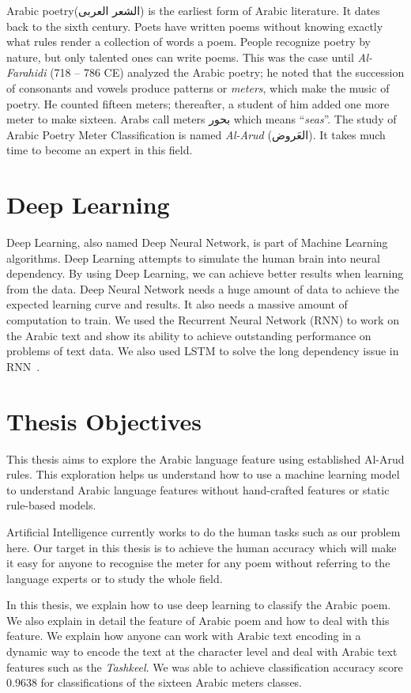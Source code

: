 Arabic poetry(\textarabic{الشعر العربى}) is the earliest form of Arabic literature. It dates back to the sixth century. Poets have written poems without knowing exactly what rules render a collection of words a poem. People recognize poetry by nature, but only talented ones can write poems. This was the case until \textit{Al-Farahidi} (718 – 786 CE) analyzed the Arabic poetry; he noted that the succession of consonants and vowels produce patterns or \textit{meters}, which make the music of poetry. He counted fifteen meters; thereafter, a student of him added one more meter to make sixteen. Arabs call meters \textarabic{بحور} which means ``\textit{seas}''. The study of Arabic Poetry Meter Classification is named \textit{Al-Arud} (\textarabic{العَروض}). It takes much time to become an expert in this field. 
\section{Deep Learning}

Deep Learning, also named Deep Neural Network, is part of Machine Learning algorithms. Deep Learning attempts to simulate the human brain into neural dependency.  By using Deep Learning, we can achieve better results when learning from the data. Deep Neural Network needs a huge amount of data to achieve the expected learning curve and results. It also needs a massive amount of computation to train. We used the Recurrent Neural Network (RNN) to work on the Arabic text and show its ability to achieve outstanding performance on problems of text data. We also used LSTM to solve the long dependency issue in RNN~.

\section{Thesis Objectives}

This thesis aims to explore the Arabic language feature using established Al-Arud rules. This exploration helps us understand how to use a machine learning model to understand Arabic language features without hand-crafted features or static rule-based models.

Artificial Intelligence currently works to do the human tasks such as our problem here. Our target in this thesis is to achieve the human accuracy which will make it easy for anyone to recognise the meter for any poem without referring to the language experts or to study the whole field.

In this thesis, we explain how to use deep learning to classify the Arabic poem. We also explain in detail the feature of Arabic poem and how to deal with this feature. We explain how anyone can work with Arabic text encoding in a dynamic way to encode the text at the character level and deal with Arabic text features such as the \textit{Tashkeel}.{\color{red} We was able to achieve classification accuracy score 0.9638 for classifications of the sixteen Arabic meters classes.}

